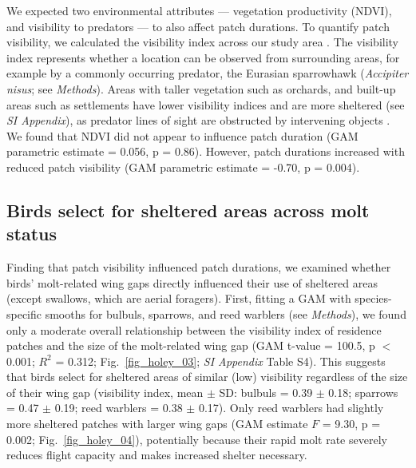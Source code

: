 \begin{refsection}
We expected two environmental attributes --- vegetation productivity (NDVI), and visibility to predators --- to also affect patch durations.
To quantify patch visibility, we calculated the visibility index across our study area \cite{olsoy2015,aben2018,aben2021}.
The visibility index represents whether a location can be observed from surrounding areas, for example by a commonly occurring predator, the Eurasian sparrowhawk (\textit{Accipiter nisus}; see \textit{Methods}).
Areas with taller vegetation such as orchards, and built-up areas such as settlements have lower visibility indices and are more sheltered (see \textit{SI Appendix}), as predator lines of sight are obstructed by intervening objects \cite{olsoy2015}.
We found that NDVI did not appear to influence patch duration (GAM parametric estimate = 0.056, p = 0.86).
However, patch durations increased with reduced patch visibility (GAM parametric estimate = -0.70, p = 0.004).

\subsection*{Birds select for sheltered areas across molt status}

Finding that patch visibility influenced patch durations, we examined whether birds' molt-related wing gaps directly influenced their use of sheltered areas (except swallows, which are aerial foragers).
First, fitting a GAM with species-specific smooths for bulbuls, sparrows, and reed warblers (see \textit{Methods}), we found only a moderate overall relationship between the visibility index of residence patches and the size of the molt-related wing gap (GAM t-value = 100.5, p $<$ 0.001; $R^2$ = 0.312; Fig.~\ref{fig_holey_03}; \textit{SI Appendix} Table S4).
This suggests that birds select for sheltered areas of similar (low) visibility regardless of the size of their wing gap (visibility index, mean $\pm$ SD: bulbuls =  0.39 $\pm$ 0.18; sparrows = 0.47 $\pm$ 0.19; reed warblers = 0.38 $\pm$ 0.17).
Only reed warblers had slightly more sheltered patches with larger wing gaps (GAM estimate $F$ = 9.30, p = 0.002; Fig.~\ref{fig_holey_04}), potentially because their rapid molt rate severely reduces flight capacity and makes increased shelter necessary.



\end{refsection}
